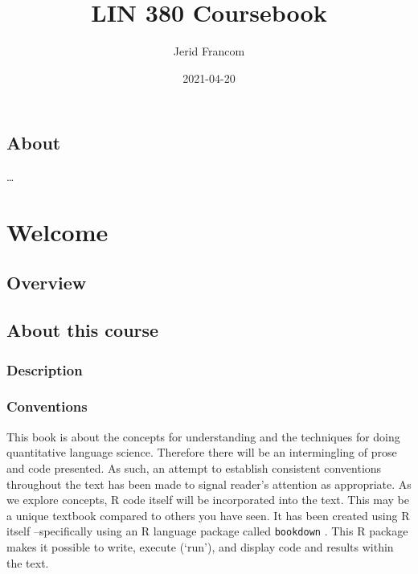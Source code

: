 \documentclass[
]{book}
\title{LIN 380 Coursebook}
\author{Jerid Francom}
\date{2021-04-20}
\begin{document}
\maketitle

{
\setcounter{tocdepth}{1}
\tableofcontents
}
\hypertarget{about}{%
\chapter*{About}\label{about}}

\ldots{}

\hypertarget{part-welcome}{%
\part{Welcome}\label{part-welcome}}

\hypertarget{course-overview}{%
\chapter*{Overview}\label{course-overview}}

\hypertarget{about-this-course}{%
\chapter*{About this course}\label{about-this-course}}

\hypertarget{description}{%
\section*{Description}\label{description}}

\hypertarget{conventions}{%
\section*{Conventions}\label{conventions}}

This book is about the concepts for understanding and the techniques for doing quantitative language science. Therefore there will be an intermingling of prose and code presented. As such, an attempt to establish consistent conventions throughout the text has been made to signal reader's attention as appropriate. As we explore concepts, R code itself will be incorporated into the text. This may be a unique textbook compared to others you have seen. It has been created using R itself --specifically using an R language package called \texttt{bookdown} \citep{R-bookdown}. This R package makes it possible to write, execute (`run'), and display code and results within the text.
\end{document}
